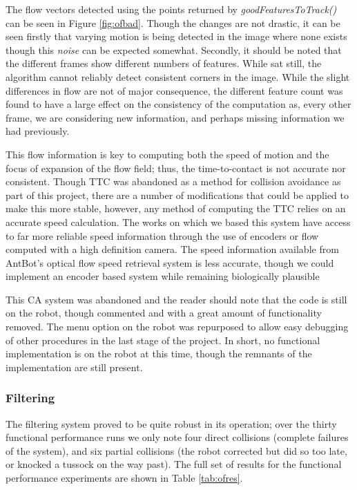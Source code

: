 \documentclass[a4paper,12pt,twoside,openright]{article}
\begin{document}
The flow vectors detected using the points returned by \textit{goodFeaturesToTrack()} can be seen in Figure \ref{fig:ofbad}.
Though the changes are not drastic, it can be seen firstly that varying motion is being detected in the image where none
exists though this \textit{noise} can be expected somewhat. Secondly, it should be noted that the different frames show different numbers
of features. While sat still, the algorithm cannot reliably detect consistent corners in the image. While the slight
differences in flow are not of major consequence, the different feature count was found to have a large effect
on the consistency of the computation as, every other frame, we are considering new information, and perhaps missing information
we had previously.
\newline

This flow information is key to computing both the speed of motion and the focus of expansion of the flow field; thus, the
time-to-contact is not accurate nor consistent. Though TTC was abandoned as a method for collision avoidance as part of this
project, there are a number of modifications that could be applied to make this more stable, however, any method of computing the
TTC relies on an accurate speed calculation. The works on which we based this system have access to far more reliable speed information
through the use of encoders or flow computed with a high definition camera. The speed information available from AntBot's optical
flow speed retrieval system is less accurate, though we could implement an encoder based system while remaining biologically
plausible \cite{Wittlinger1965}
\newline

This CA system was abandoned and the reader should note that the code is still on the robot, though commented and with
a great amount of functionality removed. The menu option on the robot was repurposed to allow easy debugging of other procedures
in the last stage of the project. In short, no functional implementation is on the robot at this time, though the remnants of
the implementation are still present.

\subsubsection{Filtering}
The filtering system proved to be quite robust in its operation; over the thirty functional performance runs we only note four direct
collisions (complete failures of the system), and six partial collisions (the robot corrected but did so too late, or knocked a
tussock on the way past). The full set of results for the functional performance experiments are shown in Table \ref{tab:ofres}.
\end{document}
